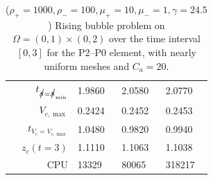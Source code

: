 \begin{table}
\begin{tabular}{rlll}
$t_{\strikes = \strikes_{\min}}$ & 1.9860 & 2.0580 & 2.0770 \\
$V_{c,\max}$                     & 0.2424 & 0.2452 & 0.2453 \\
$t_{V_c = V_{c,\max}}$           & 1.0480 & 0.9820 & 0.9940 \\
$z_c(t=3)$                       & 1.1110 & 1.1063 & 1.1038 \\
CPU                              &  13329 &  80065 & 318217 \\
\hline
\end{tabular}
\hspace*{-3.25cm}
\caption[Navier--Stokes 2d rising bubble benchmark values P2--P0]
{($\rho_+ = 1000,\rho_- = 100,\mu_+ = 10,\mu_- =1,\gamma = 24.5$)
Rising bubble problem on ${\Omega = (0,1) \times (0,2)}$ over the time interval
$[0,3]$ for the P2--P0 element, with nearly uniform meshes and
$C_a=20$\textdegree.}
\label{tab:risingbubble2Dp2p0}
\end{table}

